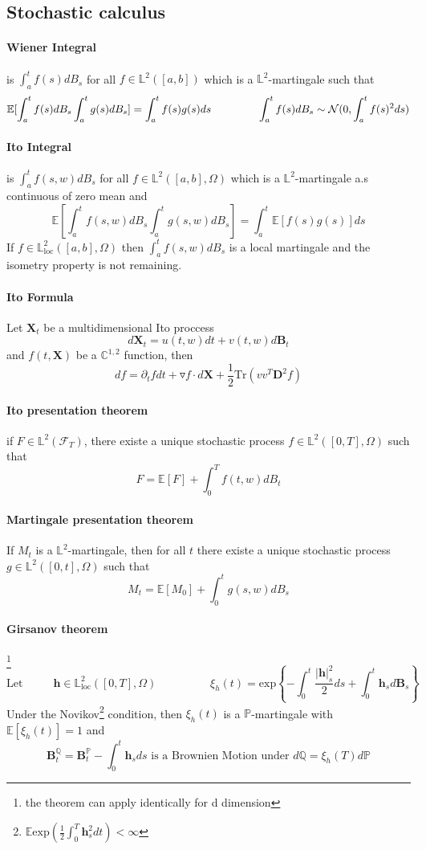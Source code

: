 \documentclass[a4paper,10pt]{article}
\begin{document}
\subsection{Stochastic calculus}
\paragraph{Wiener Integral} is $\int_a^t f(s)dB_s$ for all $f\in \mathbb{L}^2([a,b])$ which is a $\mathbb{L}^2$-martingale such that
\[
\mathbb{E}[\int_a^t f(s)dB_s \int_a^t g(s)dB_s] = \int_a^t f(s)g(s)ds
\hspace{1.5cm}
\int_a^t f(s)dB_s \sim \mathcal{N}(0, \int_a^t f(s)^2ds)
\]
\paragraph{Ito Integral} is $\int_a^t f(s,w)dB_s$ for all $f\in \mathbb{L}^2([a,b],\Omega)$ which is a $\mathbb{L}^2$-martingale a.s continuous of zero mean and
\[
\mathbb{E}[\int_a^t f(s,w)dB_s \int_a^t g(s,w)dB_s] = \int_a^t \mathbb{E}[f(s)g(s)]ds
\]
If $f\in \mathbb{L}_{\text{loc}}^2([a,b],\Omega)$ then $\int_a^t f(s,w)dB_s$ is a local martingale and the isometry property is not remaining.
\paragraph{Ito Formula}
Let $\textbf{X}_t$ be a multidimensional Ito proccess
\[
d\textbf{X}_t = u(t,w)dt + v(t,w)d\textbf{B}_t
\]
and $f(t,\textbf{X})$ be a $\mathbb{C}^{1,2}$ function, then
\[
df = \partial_t f dt + \triangledown f \cdot d\textbf{X} + \frac{1}{2} \text{Tr}(vv^T \textbf{D}^2f  )
\]
\paragraph{Ito presentation theorem}
if $F \in \mathbb{L}^2(\mathcal{F}_T)$, there existe a unique stochastic process $f\in \mathbb{L}^2([0,T],\Omega)$ such that
\[
F = \mathbb{E}[F] + \int_0^T f(t,w)dB_t
\]
\paragraph{Martingale presentation theorem}
If $M_t$ is a $\mathbb{L}^2$-martingale, then for all $t$ there existe a unique stochastic process $g\in \mathbb{L}^2([0,t],\Omega)$ such that
\[
M_t = \mathbb{E}[M_0] + \int_0^t g(s,w)dB_s
\]
\paragraph{Girsanov theorem}\footnote{the theorem can apply identically for d dimension}
\[
\text{Let }\hspace{1cm}
\textbf{h}\in \mathbb{L}_{\text{loc}}^2([0,T],\Omega)
\hspace{2cm}
\xi_h(t) = \text{exp}\left\{ -\int_0^t \frac{ |\textbf{h}|_s^2 }{2} ds + \int_0^t \textbf{h}_s d\textbf{B}_s \right\}
\]
Under the Novikov\footnote{$\mathbb{E}\text{exp}(\frac{1}{2}\int_0^T \textbf{h}^2_sdt) < \infty $} condition, then $\xi_h(t)$ is a $\mathbb{P}$-martingale with $\mathbb{E}[\xi_h(t)]=1$ and
\[
\textbf{B}^{\mathbb{Q}}_t = \textbf{B}^{\mathbb{P}}_t - \int_0^t \textbf{h}_sds \text{ is a Brownien Motion under }d\mathbb{Q} =\xi_h(T) d\mathbb{P}
\]
\end{document}
